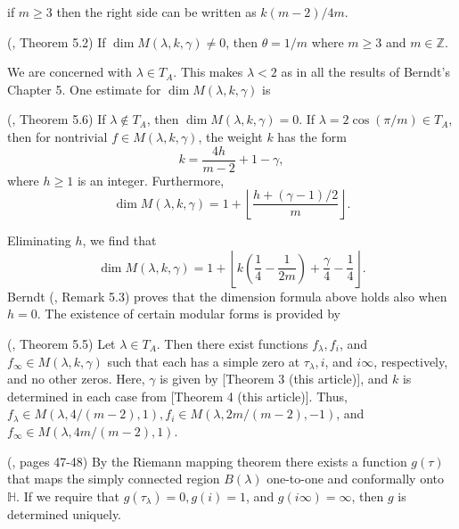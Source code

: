 \documentclass{article}
\begin{document}
if $m \geq 3$ then 
the right side can be written as $k(m-2)/4m$.
\begin{theorem}
(\cite{berndt2008hecke}, Theorem 5.2)
If $\dim M(\lambda,k,\gamma)
\neq 0$, then $\theta = 1/m$
where $m \geq 3$ and $m \in \mathbb{Z}$.
\end{theorem}
\noindent
We are concerned with
 $\lambda \in T_A$. 
This makes $\lambda < 2$ as in all 
the results of Berndt's 
Chapter 5.
\newline \newline \noindent
One estimate 
for $\dim M(\lambda, k, \gamma)$ is 
\begin{theorem}
(\cite{berndt2008hecke}, Theorem 5.6)
If $\lambda \notin T_A$, then
$\dim M(\lambda,k,\gamma) = 0$.
If $\lambda = 2\cos(\pi/m) \in T_A$,
then for nontrivial $f \in
M(\lambda,k,\gamma)$, the weight
$k$ has the form
$$
k = \frac {4h}{m-2} + 1 - \gamma,
$$
where $h \geq 1$ is an integer.
Furthermore,
$$
\dim M(\lambda,k,\gamma) = 1 + \left \lfloor
\frac{h + (\gamma-1)/2}m \right \rfloor.
$$
\end{theorem}
\noindent
Eliminating $h$, we find that
\begin{equation}
\dim M(\lambda,k,\gamma) = 1 +
\left \lfloor 
k\left (\frac 14 - \frac 1{2m} \right ) + 
\frac {\gamma}4 - 
\frac 14
\right \rfloor.
\end{equation}
Berndt  (\cite{berndt2008hecke}, Remark 5.3)
proves that the  dimension formula 
 above holds also
 when $h = 0$.
 \newline  \newline \noindent
The existence of 
 certain modular forms is
 provided by
 \begin{theorem}
 (\cite{berndt2008hecke}, Theorem 5.5)
 Let $\lambda \in T_A$. Then there exist
 functions $f_{\lambda}, f_i$, and 
 $f_{\infty} \in M(\lambda,k,\gamma)$
 such that each has a simple zero at 
 $\tau_{\lambda}, i$, and $i \infty$,
 respectively, and no other zeros. 
 Here, $\gamma$ is given by 
 [Theorem 3 (this article)],
 and $k$ is determined in each case from
 [Theorem 4 (this article)].
 Thus, $f_{\lambda} \in 
 M(\lambda, 4/(m-2), 1), f_i \in 
 M(\lambda, 2m/(m-2), -1)$, and
 $f_{\infty} \in M(\lambda, 4m/(m-2),1)$.
 \end{theorem}
 \begin{remark}
 (\cite{berndt2008hecke}, pages 47-48)
By the Riemann mapping theorem
there exists a function $g(\tau)$ that
maps the simply connected region $B(\lambda)$
one-to-one and conformally
onto $\mathbb{H}$. If
we require that
$g(\tau_{\lambda}) = 0,
g(i) = 1$, and $g(i\infty) = 
\infty$, then $g$ is determined uniquely.
 \end{remark}
\end{document}
